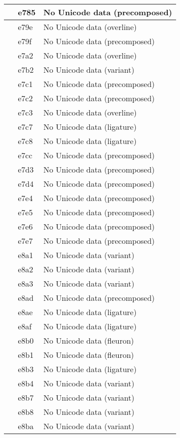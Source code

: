 \documentclass[12pt,letterpaper,openany]{book}
\begin{document}
\begin{center}
\begin{supertabular}{|m{0.25in}|m{0.5in}|m{4in}|}
 & e785 & No Unicode data (precomposed)\\\hline
 & e79e & No Unicode data (overline)\\\hline
 & e79f & No Unicode data (precomposed)\\\hline
 & e7a2 & No Unicode data (overline)\\\hline
 & e7b2 & No Unicode data (variant)\\\hline
 & e7c1 & No Unicode data (precomposed)\\\hline
 & e7c2 & No Unicode data (precomposed)\\\hline
 & e7c3 & No Unicode data (overline)\\\hline
 & e7c7 & No Unicode data (ligature)\\\hline
 & e7c8 & No Unicode data (ligature)\\\hline
 & e7cc & No Unicode data (precomposed)\\\hline
 & e7d3 & No Unicode data (precomposed)\\\hline
 & e7d4 & No Unicode data (precomposed)\\\hline
 & e7e4 & No Unicode data (precomposed)\\\hline
 & e7e5 & No Unicode data (precomposed)\\\hline
 & e7e6 & No Unicode data (precomposed)\\\hline
 & e7e7 & No Unicode data (precomposed)\\\hline
 & e8a1 & No Unicode data (variant)\\\hline
 & e8a2 & No Unicode data (variant)\\\hline
 & e8a3 & No Unicode data (variant)\\\hline
 & e8ad & No Unicode data (precomposed)\\\hline
 & e8ae & No Unicode data (ligature)\\\hline
 & e8af & No Unicode data  (ligature)\\\hline
 & e8b0 & No Unicode data (fleuron)\\\hline
 & e8b1 & No Unicode data (fleuron)\\\hline
 & e8b3 & No Unicode data (ligature)\\\hline
 & e8b4 & No Unicode data (variant)\\\hline
 & e8b7 & No Unicode data (variant)\\\hline
 & e8b8 & No Unicode data (variant)\\\hline
 & e8ba & No Unicode data (variant)\\\hline

\end{supertabular}
\end{center}
\end{document}
